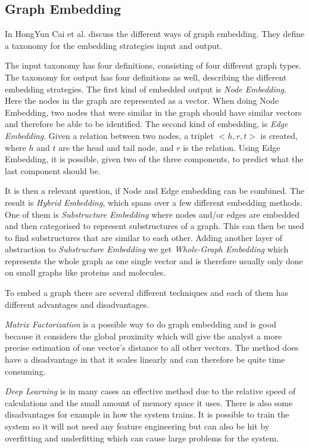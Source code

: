 \subsection{Graph Embedding}
In \cite{8294302} HongYun Cai et al. discuss the different ways of graph embedding. They define a taxonomy for the embedding strategies input and output.

The input taxonomy has four definitions, consisting of four different graph types. The taxonomy for output has four definitions as well, describing the different embedding strategies. The first kind of embedded output is \textit{Node Embedding}. Here the nodes in the graph are represented as a vector. When doing Node Embedding, two nodes that were similar in the graph should have similar vectors and therefore be able to be identified\cite{8294302}. The second kind of embedding, is \textit{Edge Embedding}. Given a relation between two nodes, a triplet $<h,r,t>$ is created,  where $h$ and $t$ are the head and tail node, and $r$ is the relation. Using Edge Embedding, it is possible, given two of the three components, to predict what the last component should be\cite{8294302}.


It is then a relevant question, if Node and Edge embedding can be combined. The result is \textit{Hybrid Embedding}, which spans over a few different embedding methods. One of them is \textit{Substructure Embedding} where nodes and/or edges are embedded and then categorised to represent substructures of a graph. This can then be used to find substructures that are similar to each other\cite{8294302}.
Adding another layer of abstraction to \textit{Substructure Embedding} we get \textit{Whole-Graph Embedding} which represents the whole graph as one single vector and is therefore usually only done on small graphs like proteins and molecules\cite{8294302}.

To embed a graph there are several different techniques and each of them has different advantages and disadvantages.

\textit{Matrix Factorization} is a possible way to do graph embedding and is good because it considers the global proximity which will give the analyst a more precise estimation of one vector's distance to all other vectors. The method does have a disadvantage in that it scales linearly and can therefore be quite time consuming\cite{8294302}.

\textit{Deep Learning} is in many cases an effective method due to the relative speed of calculations and the small amount of memory space it uses. There is also some disadvantages for example in how the system trains. It is possible to train the system so it will not need any feature engineering but can also be hit by overfitting and underfitting which can cause large problems for the system\cite{8294302}.

